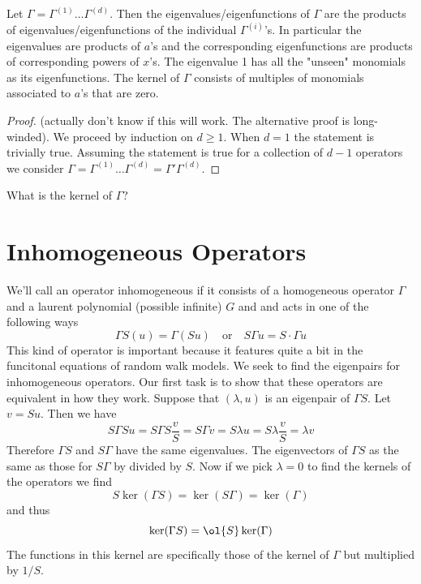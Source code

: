 \begin{proposition} Let $\Gamma = \Gamma^{(1)}\ldots \Gamma^{(d)}$. Then the eigenvalues/eigenfunctions of $\Gamma$ are the products of eigenvalues/eigenfunctions of the individual $\Gamma^{(i)}$'s. In particular the eigenvalues are products of $a$'s and the corresponding eigenfunctions are products of corresponding powers of $x$'s. The eigenvalue 1 has all the "unseen" monomials as its eigenfunctions. The kernel of $\Gamma$ consists of multiples of monomials associated to $a$'s that are zero.
\end{proposition}
\begin{proof} (actually don't know if this will work. The alternative proof is long-winded). We proceed by induction on $d \ge 1$. When $d = 1$ the statement is trivially true. Assuming the statement is true for a collection of $d-1$ operators we consider $\Gamma = \Gamma^{(1)}\ldots \Gamma^{(d)} = \Gamma' \Gamma^{(d)}$.
\end{proof}
What is the kernel of $\Gamma$?

\section{Inhomogeneous Operators}
 We'll call an operator inhomogeneous if it consists of a homogeneous operator $\Gamma$ and a laurent polynomial (possible infinite) $G$ and and acts in one of the following ways
 \[
	\Gamma S(u) = \Gamma(Su)\quad\text{or}\quad S\Gamma u = S\cdot \Gamma u
 \]
This kind of operator is important because it features quite a bit in the funcitonal equations of random walk models. We seek to find the eigenpairs for  inhomogeneous operators. Our first task is to show that these operators are equivalent in how they work. Suppose that $(\lambda, u)$ is an eigenpair of $\Gamma S$. Let $v = Su$. Then we have
\[
	S\Gamma S u = S\Gamma S \frac{v}{S} = S\Gamma v = S\lambda u = S\lambda \frac{v}{S} = \lambda v
\]
Therefore $\Gamma S$ and $S\Gamma$ have the same eigenvalues. The eigenvectors of $\Gamma S$ as the same as those for $S \Gamma$ by divided by $S$. Now if we pick $\lambda = 0$ to find the kernels of the operators we find
\[
	S\ker(\Gamma S) = \ker (S\Gamma) = \ker(\Gamma)
\]
and thus
\[
	\ker(\Gamma S) = \ol{S} \ker(\Gamma)
\]
The functions in this kernel are specifically those of the kernel of $\Gamma$ but multiplied by $1/S$.

